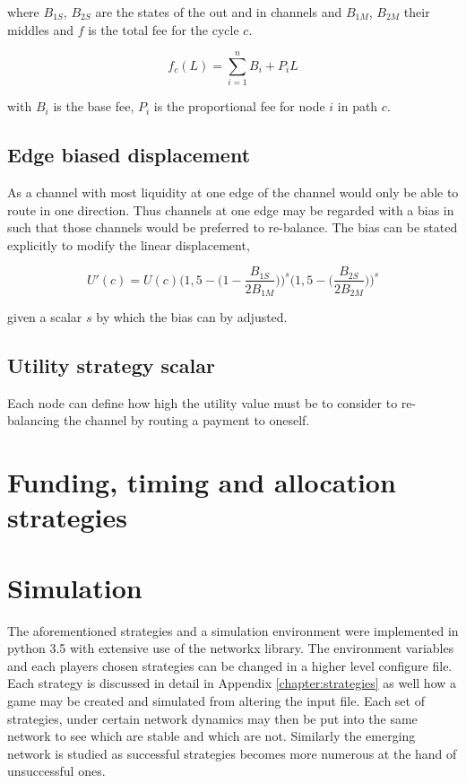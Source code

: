 where $B_{1S}$, $B_{2S}$ are the states of the out and in channels and $B_{1M}$, $B_{2M}$ their middles and $f$ is the total fee for the cycle $c$. 

\[f_c(L) = \sum_{i=1}^{n} B_i + P_iL \]

with $B_i$ is the base fee, $P_i$ is the proportional fee for node $i$ in path $c$.

\subsection{Edge biased displacement}
\label{sec:edge:bias:displacement}

As a channel with most liquidity at one edge of the channel would only be able to route in one direction. Thus channels at one edge may be regarded with a bias in such that those channels would be preferred to re-balance. The bias can be stated explicitly to modify the linear displacement,

\[ U'(c) = U(c) \bigg(1,5 - \big(1 - \dfrac{B_{1S}}{2B_{1M}}\big) \bigg)^s \bigg(1,5 - \big(\dfrac{B_{2S}}{2B_{2M}}\big)\bigg)^s  \]

given a scalar $s$ by which the bias can by adjusted.

\subsection{Utility strategy scalar}

Each node can define how high the utility value must be to consider to re-balancing the channel by routing a payment to oneself.


\section{Funding, timing and allocation strategies}

\section{Simulation}

The aforementioned strategies and a simulation environment were implemented in python 3.5 with extensive use of the networkx library. The environment variables and each players chosen strategies can be changed in a higher level configure file. Each strategy is discussed in detail in Appendix \ref{chapter:strategies} as well how a game may be created and simulated from altering the input file. Each set of strategies, under certain network dynamics may then be put into the same network to see which are stable and which are not. Similarly the emerging network is studied as successful strategies becomes more numerous at the hand of unsuccessful ones. 




